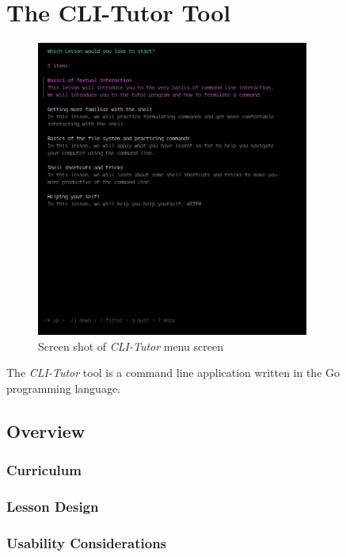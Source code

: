 \chapter{The CLI-Tutor Tool}
%
\label{chap:clitutor}

\begin{figure}[htbp]
	\centering
	\includegraphics[width=0.8\textwidth]{img/climenu}
	\caption{Screen shot of \textit{CLI-Tutor} menu screen}
	\label{fig:clitutormenu}
\end{figure}

The \textit{CLI-Tutor} tool is a command line application written in the Go programming language. 


\section{Overview}
\subsection{Curriculum}
\subsection{Lesson Design}
\subsection{Usability Considerations}
